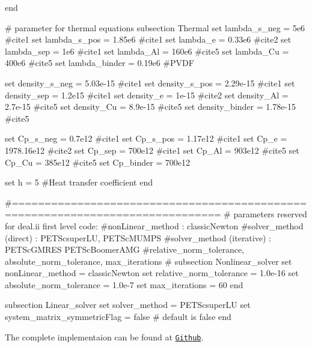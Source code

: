 \begin{DoxyCode}
end

\textcolor{preprocessor}{# parameter for thermal equations}
\textcolor{preprocessor}{}subsection Thermal
set lambda\_s\_neg = 5e6 #cite1
set lambda\_s\_pos = 1.85e6  #cite1
set lambda\_e = 0.33e6  #cite2
set lambda\_sep = 1e6  #cite1
set lambda\_Al = 160e6  #cite5
set lambda\_Cu = 400e6  #cite5
set lambda\_binder = 0.19e6 #PVDF

set density\_s\_neg = 5.03e-15  #cite1
set density\_s\_pos = 2.29e-15  #cite1
set density\_sep = 1.2e15  #cite1
set density\_e = 1e-15  #cite2
set density\_Al = 2.7e-15  #cite5
set density\_Cu = 8.9e-15  #cite5
set density\_binder = 1.78e-15  #cite5

set Cp\_s\_neg = 0.7e12  #cite1
set Cp\_s\_pos = 1.17e12  #cite1
set Cp\_e = 1978.16e12  #cite2
set Cp\_sep = 700e12  #cite1
set Cp\_Al = 903e12  #cite5
set Cp\_Cu = 385e12  #cite5
set Cp\_binder = 700e12 

set h = 5 #Heat transfer coefficient
end
            
                    
\textcolor{preprocessor}{#==============================================================================}
\textcolor{preprocessor}{}\textcolor{preprocessor}{# parameters reserved for deal.ii first level code:}
\textcolor{preprocessor}{}\textcolor{preprocessor}{#nonLinear\_method : classicNewton}
\textcolor{preprocessor}{}\textcolor{preprocessor}{#solver\_method (direct) : PETScsuperLU, PETScMUMPS}
\textcolor{preprocessor}{}\textcolor{preprocessor}{#solver\_method (iterative) : PETScGMRES PETScBoomerAMG}
\textcolor{preprocessor}{}\textcolor{preprocessor}{#relative\_norm\_tolerance, absolute\_norm\_tolerance, max\_iterations}
\textcolor{preprocessor}{}\textcolor{preprocessor}{#}
\textcolor{preprocessor}{}subsection Nonlinear\_solver
        set nonLinear\_method = classicNewton
        set relative\_norm\_tolerance = 1.0e-16
        set absolute\_norm\_tolerance = 1.0e-7
        set max\_iterations = 60
end
                        
subsection Linear\_solver
        set solver\_method = PETScsuperLU
        set system\_matrix\_symmetricFlag = \textcolor{keyword}{false} # \textcolor{keywordflow}{default} is \textcolor{keyword}{false}
end
\end{DoxyCode}
  

 

  The complete implementaion can be found at \href{https://github.com/mechanoChem/mechanoChemFEM/tree/example/Example3%20Battery%20model%20at%20particle%20scale}{\tt Github}. 